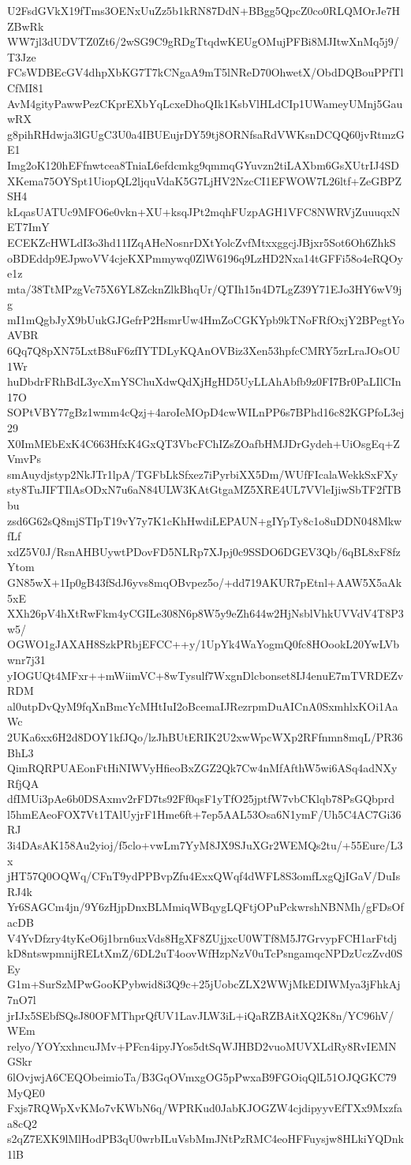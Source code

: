 U2FsdGVkX19fTms3OENxUuZz5b1kRN87DdN+BBgg5QpcZ0co0RLQMOrJe7HZBwRk
WW7jl3dUDVTZ0Zt6/2wSG9C9gRDgTtqdwKEUgOMujPFBi8MJItwXnMq5j9/T3Jze
FCsWDBEcGV4dhpXbKG7T7kCNgaA9mT5lNReD70OhwetX/ObdDQBouPPfTlCfMI81
AvM4gityPawwPezCKprEXbYqLcxeDhoQIk1KsbVlHLdCIp1UWameyUMnj5GauwRX
g8pihRHdwja3lGUgC3U0a4IBUEujrDY59tj8ORNfsaRdVWKsnDCQQ60jvRtmzGE1
Img2oK120hEFfnwtcea8TniaL6efdcmkg9qmmqGYuvzn2tiLAXbm6GsXUtrIJ4SD
XKema75OYSpt1UiopQL2ljquVdaK5G7LjHV2NzcCI1EFWOW7L26ltf+ZeGBPZSH4
kLqasUATUc9MFO6e0vkn+XU+ksqJPt2mqhFUzpAGH1VFC8NWRVjZuuuqxNET7ImY
ECEKZcHWLdI3o3hd11IZqAHeNosnrDXtYolcZvfMtxxggcjJBjxr5Sot6Oh6ZhkS
oBDEddp9EJpwoVV4cjeKXPmmywq0ZlW6196q9LzHD2Nxa14tGFFi58o4eRQOye1z
mta/38TtMPzgVc75X6YL8ZcknZlkBhqUr/QTIh15n4D7LgZ39Y71EJo3HY6wV9jg
mI1mQgbJyX9bUukGJGefrP2HsmrUw4HmZoCGKYpb9kTNoFRfOxjY2BPegtYoAVBR
6Qq7Q8pXN75LxtB8uF6zfIYTDLyKQAnOVBiz3Xen53hpfcCMRY5zrLraJOsOU1Wr
huDbdrFRhBdL3ycXmYSChuXdwQdXjHgHD5UyLLAhAbfb9z0FI7Br0PaLIlCIn17O
SOPtVBY77gBz1wmm4cQzj+4aroIeMOpD4cwWILnPP6s7BPhd16c82KGPfoL3ej29
X0ImMEbExK4C663HfxK4GxQT3VbcFChIZsZOafbHMJDrGydeh+UiOsgEq+ZVmvPs
smAuydjstyp2NkJTr1lpA/TGFbLkSfxez7iPyrbiXX5Dm/WUfFIcalaWekkSxFXy
sty8TuJIFTIlAsODxN7u6aN84ULW3KAtGtgaMZ5XRE4UL7VVleIjiwSbTF2fTBbu
zsd6G62sQ8mjSTIpT19vY7y7K1cKhHwdiLEPAUN+gIYpTy8c1o8uDDN048MkwfLf
xdZ5V0J/RsnAHBUywtPDovFD5NLRp7XJpj0c9SSDO6DGEV3Qb/6qBL8xF8fzYtom
GN85wX+1Ip0gB43fSdJ6yvs8mqOBvpez5o/+dd719AKUR7pEtnl+AAW5X5aAk5xE
XXh26pV4hXtRwFkm4yCGILe308N6p8W5y9eZh644w2HjNsblVhkUVVdV4T8P3w5/
OGWO1gJAXAH8SzkPRbjEFCC++y/1UpYk4WaYogmQ0fc8HOookL20YwLVbwnr7j31
yIOGUQt4MFxr++mWiimVC+8wTysulf7WxgnDlcbonset8IJ4enuE7mTVRDEZvRDM
al0utpDvQyM9fqXnBmcYcMHtIuI2oBcemaIJRezrpmDuAICnA0SxmhlxKOi1AaWc
2UKa6xx6H2d8DOY1kfJQo/lzJhBUtERIK2U2xwWpcWXp2RFfnmn8mqL/PR36BhL3
QimRQRPUAEonFtHiNIWVyHfieoBxZGZ2Qk7Cw4nMfAfthW5wi6ASq4adNXyRfjQA
dfIMUi3pAe6b0DSAxmv2rFD7ts92Ff0qsF1yTfO25jptfW7vbCKlqb78PsGQbprd
l5hmEAeoFOX7Vt1TAlUyjrF1Hme6ft+7ep5AAL53Osa6N1ymF/Uh5C4AC7Gi36RJ
3i4DAsAK158Au2yioj/f5clo+vwLm7YyM8JX9SJuXGr2WEMQs2tu/+55Eure/L3x
jHT57Q0OQWq/CFnT9ydPPBvpZfu4ExxQWqf4dWFL8S3omfLxgQjIGaV/DuIsRJ4k
Yr6SAGCm4jn/9Y6zHjpDnxBLMmiqWBqygLQFtjOPuPckwrshNBNMh/gFDsOfacDB
V4YvDfzry4tyKeO6j1brn6uxVds8HgXF8ZUjjxcU0WTf8M5J7GrvypFCH1arFtdj
kD8ntswpmnijRELtXmZ/6DL2uT4oovWfHzpNzV0uTcPsngamqcNPDzUczZvd0SEy
G1m+SurSzMPwGooKPybwid8i3Q9c+25jUobcZLX2WWjMkEDIWMya3jFhkAj7nO7l
jrIJx5SEbfSQsJ80OFMThprQfUV1LavJLW3iL+iQaRZBAitXQ2K8n/YC96hV/WEm
relyo/YOYxxhncuJMv+PFcn4ipyJYos5dtSqWJHBD2vuoMUVXLdRy8RvIEMNGSkr
6lOvjwjA6CEQObeimioTa/B3GqOVmxgOG5pPwxaB9FGOiqQlL51OJQGKC79MyQE0
Fxjs7RQWpXvKMo7vKWbN6q/WPRKud0JabKJOGZW4cjdipyyvEfTXx9Mxzfaa8cQ2
s2qZ7EXK9lMlHodPB3qU0wrbILuVsbMmJNtPzRMC4eoHFFuysjw8HLkiYQDnk1lB
